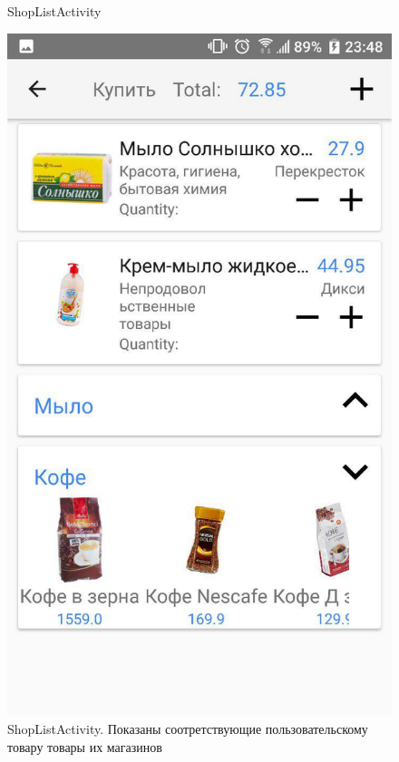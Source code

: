 \begin{my_enumerate}
\begin{figure}[h!]
    \caption{\small{ShopListActivity}}
    \label{shoplist1}
    \endminipage\hfill
    \includegraphics[height=0.42\textheight]{./screenshots/3/shoplist_custom_fold.jpg}
    \caption{\small{ShopListActivity. Показаны соотретствующие пользовательскому товару товары их магазинов}}
    \label{shoplist2}
    \endminipage
\end{figure}
\end{my_enumerate}

